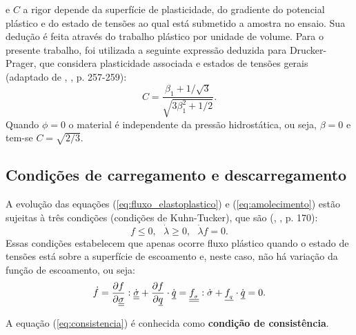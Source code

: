 e $C$ a rigor depende da superfície de plasticidade, do gradiente do potencial plástico e do estado de tensões ao qual está submetido a amostra no ensaio. Sua dedução é feita através do trabalho plástico por unidade de volume. Para o presente trabalho, foi utilizada a seguinte expressão deduzida para Drucker-Prager, que considera plasticidade associada e estados de tensões gerais (adaptado de \citeauthor{Chen1988}, \citeyear{Chen1988}, p. 257-259):
\begin{equation}
	\label{eq:Czao}
	C = \dfrac{\beta_1+1/\sqrt{3}}{\sqrt{3\beta_1^2+1/2}}.
\end{equation}
Quando $\phi = 0$ o material é independente da pressão hidrostática, ou seja, $\beta = 0$ e tem-se $C = \sqrt{2/3}$.

\subsection{Condições de carregamento e descarregamento}

A evolução das equações (\ref{eq:fluxo_elastoplastico}) e (\ref{eq:amolecimento}) estão sujeitas à três condições (condições de Kuhn-Tucker), que são (\citeauthor{Neto2008}, \citeyear{Neto2008}, p. 170):
\begin{equation}
	\label{eq:kuhntucker}
	f \le 0,~~~ \dot \lambda \ge 0, ~~~ \dot \lambda f = 0.
\end{equation}
Essas condições estabelecem que apenas ocorre fluxo plástico quando o estado de tensões está sobre a superfície de escoamento e, neste caso, não há variação da função de escoamento, ou seja:
\begin{equation}
	\label{eq:consistencia}
	\dot f = \dfrac{\partial f}{\partial \underline{\underline \sigma}}:\dot {\underline{\underline \sigma}} + \dfrac{\partial f}{\partial \underline q}\cdot \dot {\underline q} = \underline{\underline {f_{_\sigma}}}:\dot \sigma + \underline{f_{_q}} \cdot \dot {\underline q} = 0.
\end{equation}

A equação (\ref{eq:consistencia}) é conhecida como \textbf{condição de consistência}.

